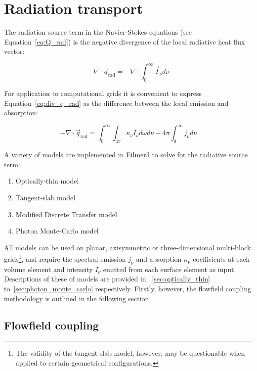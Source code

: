 
\section{Radiation transport}
\label{sec:radiation_transport}

The radiation source term in the Navier-Stokes equations (see Equation~\ref{eq:Q_rad}) is the negative divergence of the local radiative heat flux vector:

\begin{equation}
 - \nabla \cdot \vec{q}_\text{rad} = - \nabla \cdot \int_0^\infty \vec{I}_\nu d \nu \label{eq:div_q_rad}
\end{equation}

\noindent For application to computational grids it is convenient to express Equation~\ref{eq:div_q_rad} as the difference between the local emission and absorption:

\begin{equation}
- \nabla \cdot \vec{q}_\text{rad} =  \int^{\infty}_{0} \int_{4\pi} \kappa_{\nu} I_{\nu} d \omega d \nu - 4 \pi \int^{\infty}_{0} j_{\nu} d \nu
 \label{eq:divq_rad}
\end{equation}

A variety of models are implemented in Eilmer3  to solve for the radiative source term:

\begin{enumerate}
 \item Optically-thin model
 \item Tangent-slab model
 \item Modified Discrete Transfer model
 \item Photon Monte-Carlo model
\end{enumerate}

All models can be used on planar, axisymmetric or three-dimensional multi-block grids\footnote{The validity of the tangent-slab model, however, may be questionable when applied to certain geometrical configurations.}, and require the spectral emission $j_\nu$ and absorption $\kappa_\nu$ coefficients at each volume element and intensity $I_\nu$ emitted from each surface element as input.
Descriptions of these of models are provided in \textsection~\ref{sec:optically_thin} to~\ref{sec:photon_monte_carlo} respectively.
Firstly, however, the flowfield coupling methodology is outlined in the following section.

\subsection{Flowfield coupling}
\label{sec:fc}


